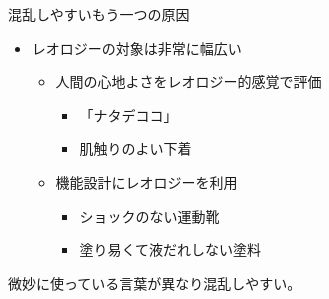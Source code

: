 \begin{frame}

\begin{block}{混乱しやすいもう一つの原因}

\begin{itemize}
\tightlist
\item
  レオロジーの対象は非常に幅広い

  \begin{itemize}
  \tightlist
  \item
    人間の心地よさをレオロジー的感覚で評価

    \begin{itemize}
    \tightlist
    \item
      「ナタデココ」
    \item
      肌触りのよい下着
    \end{itemize}
  \item
    機能設計にレオロジーを利用

    \begin{itemize}
    \tightlist
    \item
      ショックのない運動靴
    \item
      塗り易くて液だれしない塗料
    \end{itemize}
  \end{itemize}
\end{itemize}

{微妙に使っている言葉が異なり混乱しやすい。}

\end{block}

\end{frame}


